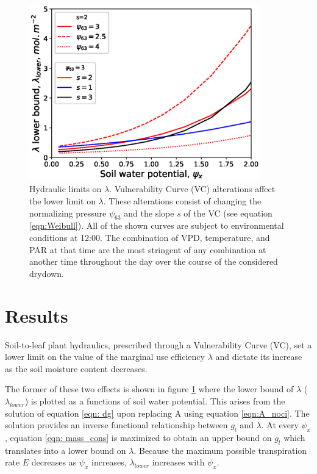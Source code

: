 \documentclass[utf8]{frontiersSCNS} %
\begin{document}
\begin{figure}[t]
\begin{center}
\includegraphics[width=10cm]{Fig1.eps}
\end{center}
\caption{Hydraulic limits on $\lambda$. Vulnerability Curve (VC) alterations affect the lower limit on $\lambda$. These alterations consist of changing the normalizing pressure $\psi_{63}$ and the slope $s$ of the VC (see equation \ref{eqn:Weibull}). All of the shown curves are subject to environmental conditions at 12:00. The combination of VPD, temperature, and PAR at that time are the most stringent of any combination at another time throughout the day over the course of the considered drydown.}\label{fig:lam_lower}
\end{figure}

\section{Results}

Soil-to-leaf plant hydraulics, prescribed through a Vulnerability Curve (VC), set a lower limit on the value of the marginal use efficiency $\lambda$ and dictate its increase as the soil moisture content decreases.

The former of these two effects is shown in figure \ref{fig:lam_lower} where the lower bound of $\lambda$ ($\lambda_{lower}$) is plotted as a functions of soil water potential. This arises from the solution of equation \ref{eqn: dg} upon replacing A using equation \ref{eqn:A_noci}. The solution provides an inverse functional relationship between $g_l$ and $\lambda$. At every $\psi_x$, equation \ref{eqn: mass_cons} is maximized to obtain an upper bound on $g_l$ which translates into a lower bound on $\lambda$. Because the maximum possible transpiration rate $E$ decreases as $\psi_x$ increases, $\lambda_{lower}$ increases with $\psi_x$.
\end{document}
